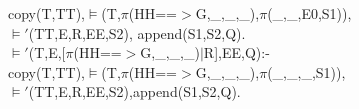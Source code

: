 \documentclass[11pt]{report}
\begin{document}
\begin{itemize}
\begin{sf}
\begin{tabbing}
\hspace{2em}copy(T,TT),$\models$(T,$\pi$(HH==$>$G,\_\hspace{0.1em},\_\hspace{0.1em},\_\hspace{0.1em}),$\pi$(\_\hspace{0.1em},\_\hspace{0.1em},E0,S1)), \\[-0.15ex]
\hspace{2em}$\models'$(TT,E,R,EE,S2), append(S1,S2,Q).\\[-0.15ex]
$\models'$(T,E,[$\pi$(HH==$>$G,\_\hspace{0.1em},\_\hspace{0.1em},\_\hspace{0.1em})$\mid$R],EE,Q):- \\[-0.15ex]
\hspace{2em}copy(T,TT),$\models$(T,$\pi$(HH==$>$G,\_\hspace{0.1em},\_\hspace{0.1em},\_\hspace{0.1em}),$\pi$(\_\hspace{0.1em},\_\hspace{0.1em},\_\hspace{0.1em},S1)),\\[-0.15ex]
\hspace{2em}$\models'$(TT,E,R,EE,S2),append(S1,S2,Q).\\[-0.7ex]

\end{tabbing}\end{sf}


\end{itemize}
\end{document}

